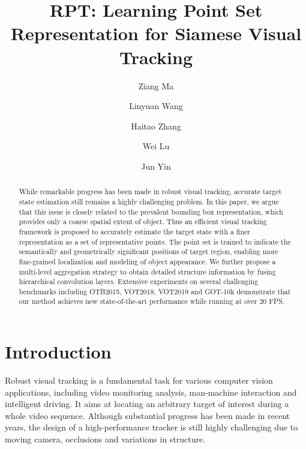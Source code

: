 \documentclass[runningheads]{llncs}
\begin{document}
\pagestyle{headings}
\mainmatter
\def\ECCVSubNumber{5}  

\title{RPT: Learning Point Set Representation for Siamese Visual Tracking} 


\author{Ziang Ma \and
Linyuan Wang \and
Haitao Zhang \and
Wei Lu \and
Jun Yin
}

\maketitle

\begin{abstract}
While remarkable progress has been made in robust visual tracking, accurate target state estimation still remains a highly challenging problem. In this paper, we argue that this issue is closely related to the prevalent bounding box representation, which provides only a coarse spatial extent of object. Thus an efficient visual tracking framework is proposed to accurately estimate the target state with a finer representation as a set of representative points. The point set is trained to indicate the semantically and geometrically significant positions of target region, enabling more fine-grained localization and modeling of object appearance. We further propose a multi-level aggregation strategy to obtain detailed structure information by fusing hierarchical convolution layers. Extensive experiments on several challenging benchmarks including OTB2015, VOT2018, VOT2019 and GOT-10k demonstrate that our method achieves new state-of-the-art performance while running at over 20 FPS. 
\end{abstract}


\section{Introduction}

Robust visual tracking is a fundamental task for various computer vision
applications, including video monitoring analysis, man-machine
interaction and intelligent driving. It aims at locating an arbitrary
target of interest during a whole video sequence. Although substantial
progress has been made in recent years, the design of a high-performance
tracker is still highly challenging due to moving camera, occlusions and
variations in structure.
\end{document}
